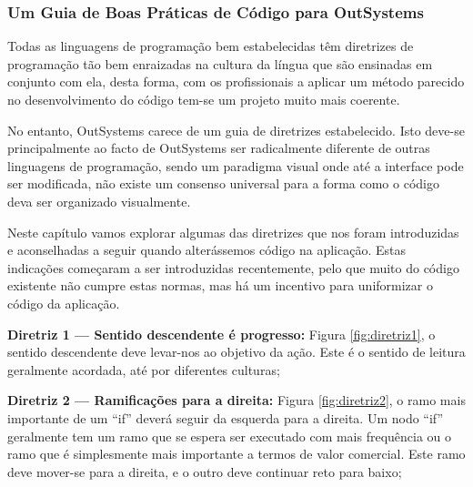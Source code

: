 \subsubsection{Um Guia de Boas Práticas de Código para OutSystems}\label{secsec:um-guia-de-estilo-de-codigo}

    Todas as linguagens de programação bem estabelecidas têm diretrizes de programação tão bem enraizadas na cultura da língua que são ensinadas em conjunto com ela, desta forma, com os profissionais a aplicar um método parecido no desenvolvimento do código tem-se um projeto muito mais coerente.

    No entanto, OutSystems carece de um guia de diretrizes estabelecido. Isto deve-se principalmente ao facto de OutSystems ser radicalmente diferente de outras linguagens de programação, sendo um paradigma visual onde até a interface pode ser modificada, não existe um consenso universal para a forma como o código deva ser organizado visualmente.

    Neste capítulo vamos explorar algumas das diretrizes que nos foram introduzidas e aconselhadas a seguir quando alterássemos código na aplicação. Estas indicações começaram a ser introduzidas recentemente, pelo que muito do código existente não cumpre estas normas, mas há um incentivo para uniformizar o código da aplicação.

    \textbf{Diretriz 1 — Sentido descendente é progresso:} Figura \ref{fig:diretriz1}, o sentido descendente deve levar-nos ao objetivo da ação. Este é o sentido de leitura geralmente acordada, até por diferentes culturas;

    \textbf{Diretriz 2 — Ramificações para a direita:} Figura \ref{fig:diretriz2}, o ramo mais importante de um ``if'' deverá seguir da esquerda para a direita. Um nodo ``if'' geralmente tem um ramo que se espera ser executado com mais frequência ou o ramo que é simplesmente mais importante a termos de valor comercial. Este ramo deve mover-se para a direita, e o outro deve continuar reto para baixo;

